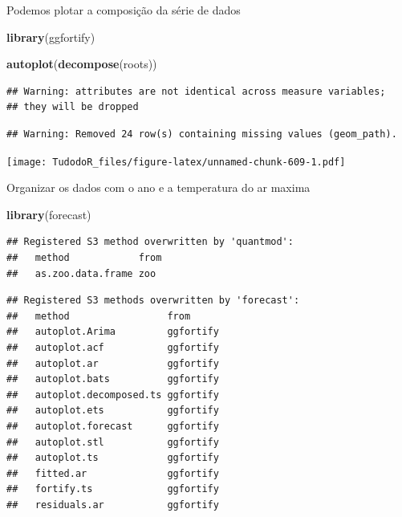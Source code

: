 \documentclass[
]{book}
\newenvironment{Shaded}{\begin{snugshade}}{\end{snugshade}}
\newcommand{\KeywordTok}[1]{\textcolor[rgb]{0.13,0.29,0.53}{\textbf{#1}}}
\newcommand{\NormalTok}[1]{#1}
\begin{document}
Podemos plotar a composição da série de dados

\begin{Shaded}
\begin{Highlighting}[]
\KeywordTok{library}\NormalTok{(ggfortify)}
\end{Highlighting}
\end{Shaded}

\begin{Shaded}
\begin{Highlighting}[]
\KeywordTok{autoplot}\NormalTok{(}\KeywordTok{decompose}\NormalTok{(roots))}
\end{Highlighting}
\end{Shaded}

\begin{verbatim}
## Warning: attributes are not identical across measure variables;
## they will be dropped
\end{verbatim}

\begin{verbatim}
## Warning: Removed 24 row(s) containing missing values (geom_path).
\end{verbatim}

\texttt{[image: TudodoR\_files/figure-latex/unnamed-chunk-609-1.pdf]}

Organizar os dados com o ano e a temperatura do ar maxima

\begin{Shaded}
\begin{Highlighting}[]
\KeywordTok{library}\NormalTok{(forecast)}
\end{Highlighting}
\end{Shaded}

\begin{verbatim}
## Registered S3 method overwritten by 'quantmod':
##   method            from
##   as.zoo.data.frame zoo
\end{verbatim}

\begin{verbatim}
## Registered S3 methods overwritten by 'forecast':
##   method                 from     
##   autoplot.Arima         ggfortify
##   autoplot.acf           ggfortify
##   autoplot.ar            ggfortify
##   autoplot.bats          ggfortify
##   autoplot.decomposed.ts ggfortify
##   autoplot.ets           ggfortify
##   autoplot.forecast      ggfortify
##   autoplot.stl           ggfortify
##   autoplot.ts            ggfortify
##   fitted.ar              ggfortify
##   fortify.ts             ggfortify
##   residuals.ar           ggfortify
\end{verbatim}
\end{document}
